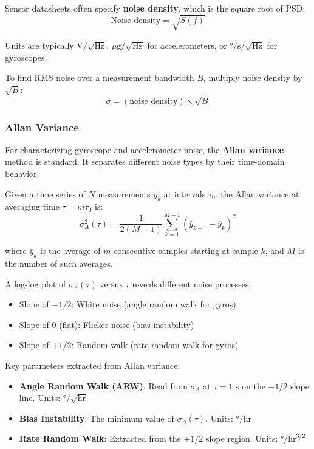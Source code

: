 Sensor datasheets often specify \textbf{noise density}, which is the square root of PSD:
\begin{equation}
\text{Noise density} = \sqrt{S(f)}
\label{eq:noise_density}
\end{equation}

Units are typically $\text{V}/\sqrt{\text{Hz}}$, $\mu\text{g}/\sqrt{\text{Hz}}$ for accelerometers, or $°/\text{s}/\sqrt{\text{Hz}}$ for gyroscopes.

To find RMS noise over a measurement bandwidth $B$, multiply noise density by $\sqrt{B}$:
\begin{equation}
\sigma = (\text{noise density}) \times \sqrt{B}
\label{eq:rms_from_density}
\end{equation}

\subsubsection{Allan Variance}

For characterizing gyroscope and accelerometer noise, the \textbf{Allan variance} method is standard. It separates different noise types by their time-domain behavior.

Given a time series of $N$ measurements $y_k$ at intervals $\tau_0$, the Allan variance at averaging time $\tau = m\tau_0$ is:
\begin{equation}
\sigma^2_A(\tau) = \frac{1}{2(M-1)} \sum_{k=1}^{M-1} \left(\bar{y}_{k+1} - \bar{y}_k\right)^2
\label{eq:allan_variance}
\end{equation}

where $\bar{y}_k$ is the average of $m$ consecutive samples starting at sample $k$, and $M$ is the number of such averages.

A log-log plot of $\sigma_A(\tau)$ versus $\tau$ reveals different noise processes:
\begin{itemize}
    \item Slope of $-1/2$: White noise (angle random walk for gyros)
    \item Slope of $0$ (flat): Flicker noise (bias instability)
    \item Slope of $+1/2$: Random walk (rate random walk for gyros)
\end{itemize}

Key parameters extracted from Allan variance:
\begin{itemize}
    \item \textbf{Angle Random Walk (ARW)}: Read from $\sigma_A$ at $\tau = 1\text{ s}$ on the $-1/2$ slope line. Units: $°/\sqrt{\text{hr}}$
    \item \textbf{Bias Instability}: The minimum value of $\sigma_A(\tau)$. Units: $°/\text{hr}$
    \item \textbf{Rate Random Walk}: Extracted from the $+1/2$ slope region. Units: $°/\text{hr}^{3/2}$
\end{itemize}

